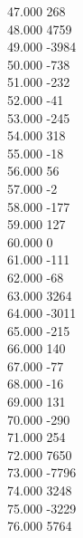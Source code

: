 { 47.000	268 \\
 48.000	4759 \\
 49.000	-3984 \\
 50.000	-738 \\
 51.000	-232 \\
 52.000	-41 \\
 53.000	-245 \\
 54.000	318 \\
 55.000	-18 \\
 56.000	56 \\
 57.000	-2 \\
 58.000	-177 \\
 59.000	127 \\
 60.000	0 \\
 61.000	-111 \\
 62.000	-68 \\
 63.000	3264 \\
 64.000	-3011 \\
 65.000	-215 \\
 66.000	140 \\
 67.000	-77 \\
 68.000	-16 \\
 69.000	131 \\
 70.000	-290 \\
 71.000	254 \\
 72.000	7650 \\
 73.000	-7796 \\
 74.000	3248 \\
 75.000	-3229 \\
 76.000	5764 \\
}
